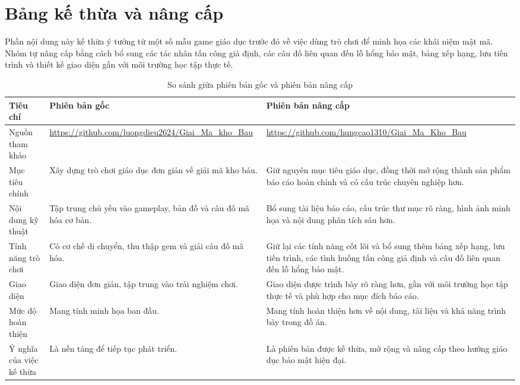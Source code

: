 \section{Bảng kế thừa và nâng cấp}

Phần nội dung này kế thừa ý tưởng từ một số mẫu game giáo dục trước đó về việc dùng trò chơi để minh họa các khái niệm mật mã. Nhóm tự nâng cấp bằng cách bổ sung các tác nhân tấn công giả định, các câu đố liên quan đến lỗ hổng bảo mật, bảng xếp hạng, lưu tiến trình và thiết kế giao diện gần với môi trường học tập thực tế.

\begin{table}[H]
\centering
\caption{So sánh giữa phiên bản gốc và phiên bản nâng cấp}
\label{tab:ke-thua-nang-cap}
\begin{tabular}{|p{3.8cm}|p{4.5cm}|p{4.5cm}|}
\hline
\textbf{Tiêu chí} & \textbf{Phiên bản gốc} & \textbf{Phiên bản nâng cấp} \\ \hline
Nguồn tham khảo & \url{https://github.com/luongdieu2624/Giai_Ma_kho_Bau} & \url{https://github.com/hungcao1310/Giai_Ma_Kho_Bau} \\ \hline
Mục tiêu chính & Xây dựng trò chơi giáo dục đơn giản về giải mã kho báu. & Giữ nguyên mục tiêu giáo dục, đồng thời mở rộng thành sản phẩm báo cáo hoàn chỉnh và có cấu trúc chuyên nghiệp hơn. \\ \hline
Nội dung kỹ thuật & Tập trung chủ yếu vào gameplay, bản đồ và câu đố mã hóa cơ bản. & Bổ sung tài liệu báo cáo, cấu trúc thư mục rõ ràng, hình ảnh minh họa và nội dung phân tích sâu hơn. \\ \hline
Tính năng trò chơi & Có cơ chế di chuyển, thu thập gem và giải câu đố mã hóa. & Giữ lại các tính năng cốt lõi và bổ sung thêm bảng xếp hạng, lưu tiến trình, các tình huống tấn công giả định và câu đố liên quan đến lỗ hổng bảo mật. \\ \hline
Giao diện & Giao diện đơn giản, tập trung vào trải nghiệm chơi. & Giao diện được trình bày rõ ràng hơn, gần với môi trường học tập thực tế và phù hợp cho mục đích báo cáo. \\ \hline
Mức độ hoàn thiện & Mang tính minh họa ban đầu. & Mang tính hoàn thiện hơn về nội dung, tài liệu và khả năng trình bày trong đồ án. \\ \hline
Ý nghĩa của việc kế thừa & Là nền tảng để tiếp tục phát triển. & Là phiên bản được kế thừa, mở rộng và nâng cấp theo hướng giáo dục bảo mật hiện đại. \\ \hline
\end{tabular}
\end{table}

